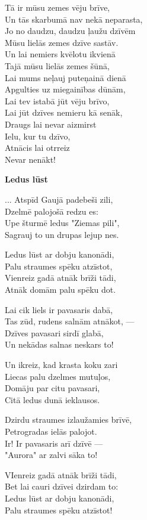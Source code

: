 \documentclass[11pt]{article}
\begin{document}
{Tā ir mūsu zemes vēju brīve,\\
Un tās skarbumā nav nekā neparasta,\\
Jo no daudzu, daudzu ļaužu dzīvēm\\
Mūsu lielās zemes dzīve sastāv.\\
Un lai nemiers kvēlotu ikvienā\\
Tajā mūsu lielās zemes šūnā,\\
Lai mums neļauj puteņainā dienā\\
Apgulties uz miegainības dūnām,\\
Lai tev istabā jūt vēju brīvo,\\
Lai jūt dzīves nemieru kā senāk,\\
Draugs lai nevar aizmirst\\
Ielu, kur tu dzīvo,\\
Atnācis lai otrreiz\\
Nevar nenākt!

\newpage

{\bf Ledus lūst}

... Atspīd Gaujā padebeši zili,\\
Dzelmē palojošā redzu es:\\
Upe šturmē ledus "Ziemas pili",\\
Sagrauj to un drupas lejup nes.

Ledus lūst ar dobju kanonādi,\\
Palu straumes spēku atzīstot,\\
Vienreiz gadā atnāk brīži tādi,\\
Atnāk domām palu spēku dot.

Lai cik liels ir pavasaris dabā,\\
Tas zūd, rudens salnām atnākot, ---\\
Dzīves pavasari sirdī glabā,\\
Un nekādas salnas neskars to!

Un ikreiz, kad krasta koku zari\\
Liecas palu dzelmes mutuļos,\\
Domāju par citu pavasari,\\
Citā ledus dunā ieklausos.

Dzirdu straumes izlaužamies brīvē,\\
Petrogradas ielās palojot.\\
Ir! Ir pavasaris arī dzīvē ---\\
"Aurora" ar zalvi sāka to!

VIenreiz gadā atnāk brīži tādi,\\
Bet lai cauri dzīvei dzirdam to:\\
Ledus lūst ar dobju kanonādi,\\
Palu straumes spēku atzīstot!


}
\end{document}
